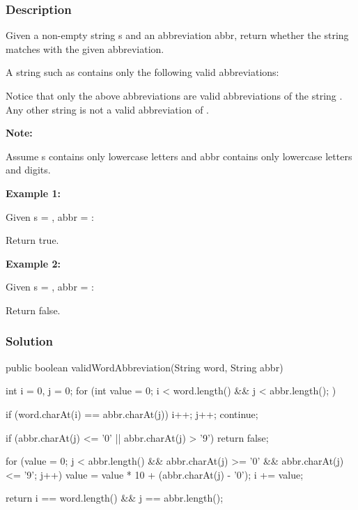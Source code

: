 \subsubsection{Description}
Given a non-empty string s and an abbreviation abbr, return whether the string matches with the given abbreviation.

A string such as  contains only the following valid abbreviations:


Notice that only the above abbreviations are valid abbreviations of the string . Any other string is not a valid abbreviation of .

\textbf{Note:}

Assume s contains only lowercase letters and abbr contains only lowercase letters and digits.

\textbf{Example 1:}

Given s = , abbr = :

Return true.

\textbf{Example 2:}

Given s = , abbr = :

Return false.

\subsubsection{Solution}

\begin{Code}
public boolean validWordAbbreviation(String word, String abbr) {
    int i = 0, j = 0;
    for (int value = 0; i < word.length() && j < abbr.length(); ) {
        if (word.charAt(i) == abbr.charAt(j)) {
            i++; j++;
            continue;
        }

        if (abbr.charAt(j) <= '0' || abbr.charAt(j) > '9') {
            return false;
        }

        for (value = 0; j < abbr.length() && abbr.charAt(j) >= '0' && abbr.charAt(j) <= '9'; j++) {
            value = value * 10 + (abbr.charAt(j) - '0');
        }
        i += value;
    }
    return i == word.length() && j == abbr.length();
}
\end{Code}

\newpage